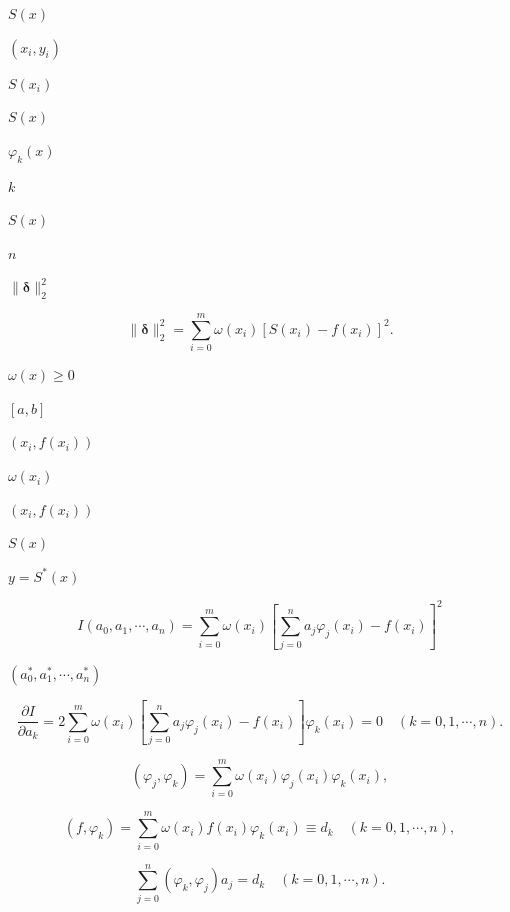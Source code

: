 \documentclass[UTF8,fontset=fandol,a4paper]{ctexart}
\begin{document}
\noindent $S(x)$\par

\noindent $(x_i,y_i)$\par

\noindent $S(x_i)$\par

\noindent $S(x)$\par

\noindent $\varphi_k(x)$\par

\noindent $k$\par

\noindent $S(x)$\par

\noindent $n$\par

\noindent $\|\boldsymbol\delta\|_2^2$\par

\[
\|\boldsymbol\delta\|_2^2=\sum_{i=0}^m\omega(x_i)[S(x_i)-f(x_i)]^2.\tag{3.6.3}
\]

\noindent $\omega(x)\geqslant0$\par

\noindent $[a,b]$\par

\noindent $(x_i,f(x_i))$\par

\noindent $\omega(x_i)$\par

\noindent $(x_i,f(x_i))$\par

\noindent $S(x)$\par

\noindent $y=S^*(x)$\par

\[
I(a_0,a_1,\cdots,a_n)=\sum_{i=0}^m\omega(x_i)\left[\sum_{j=0}^na_j\varphi_j(x_i)-f(x_i)\right]^2\tag{3.6.4}
\]

\noindent $(a_0^*,a_1^*,\cdots,a_n^*)$\par

\[
\frac{\partial I}{\partial a_k}=2\sum_{i=0}^m\omega(x_i)\left[\sum_{j=0}^na_j\varphi_j(x_i)-f(x_i)\right]\varphi_k(x_i)=0\quad(k=0,1,\cdots,n).
\]

\[
(\varphi_j,\varphi_k)=\sum_{i=0}^m\omega(x_i)\varphi_j(x_i)\varphi_k(x_i),\tag{3.6.5}
\]

\[
(f,\varphi_k)=\sum_{i=0}^m\omega(x_i)f(x_i)\varphi_k(x_i)\equiv d_k\quad(k=0,1,\cdots,n),
\]

\[
\sum_{j=0}^n(\varphi_k,\varphi_j)a_j=d_k\quad(k=0,1,\cdots,n).\tag{3.6.6}
\]
\end{document}
